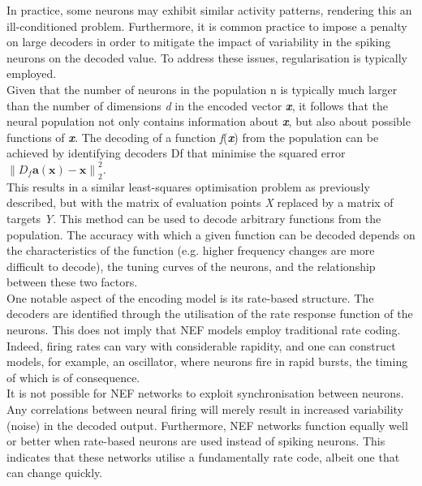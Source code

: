 \noindent In practice, some neurons may exhibit similar activity patterns, rendering this an ill-conditioned problem. Furthermore, it is common practice to impose a penalty on large decoders in order to mitigate the impact of variability in the spiking neurons on the decoded value. To address these issues, regularisation is typically employed. \\

\noindent Given that the number of neurons in the population n is typically much larger than the number of dimensions \textit{d} in the encoded vector \textbf{\textit{x}}, it follows that the neural population not only contains information about \textbf{\textit{x}}, but also about possible functions of \textbf{\textit{x}}. The decoding of a function \textit{f}(\textbf{\textit{x}}) from the population can be achieved by identifying decoders Df that minimise the squared error $\left\| D_f \textbf{a} (\textbf{x})  - \textbf{x}\right\|^{2}_{2}$.\\

\noindent This results in a similar least-squares optimisation problem as previously described, but with the matrix of evaluation points \textit{X} replaced by a matrix of targets \textit{Y}. This method can be used to decode arbitrary functions from the population. The accuracy with which a given function can be decoded depends on the characteristics of the function (e.g. higher frequency changes are more difficult to decode), the tuning curves of the neurons, and the relationship between these two factors. \\

\noindent One notable aspect of the encoding model is its rate-based structure. The decoders are identified through the utilisation of the rate response function of the neurons. This does not imply that NEF models employ traditional rate coding. Indeed, firing rates can vary with considerable rapidity, and one can construct models, for example, an oscillator, where neurons fire in rapid bursts, the timing of which is of consequence.\\

\noindent It is not possible for NEF networks to exploit synchronisation between neurons. Any correlations between neural firing will merely result in increased variability (noise) in the decoded output. Furthermore, NEF networks function equally well or better when rate-based neurons are used instead of spiking neurons. This indicates that these networks utilise a fundamentally rate code, albeit one that can change quickly. \\

